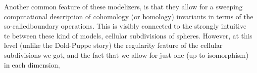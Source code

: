 Another common feature of these modelizers, is that they allow for
a sweeping computational description of cohomology (or homology) invariants
in terms of the so-calledboundary operations. This is visibly connected
to the \hand{(}strongly intuitive\hand{)} te between these kind of models,  cellular
subdivisions of spheres. However, at this level (unlike the Dold-Puppe
story) the regularity feature of the cellular subdivisions we got, and
the fact that we allow for just one (up to isomorphism) in each dimension,

